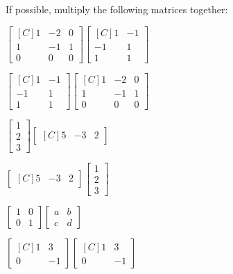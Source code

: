 \begin{exercise} If possible, multiply the following matrices together:\\
\begin{inparaenum}[a)]
\item $\begin{bmatrix*}[C] 1 & -2 & 0 \\ 1 & -1 & 1 \\ 0 & 0 & 0 \end{bmatrix*}\begin{bmatrix*}[C] 1 & -1 \\ -1 & 1 \\ 1 & 1 \end{bmatrix*}$ \hfill
\item $\begin{bmatrix*}[C] 1 & -1 \\ -1 & 1 \\ 1 & 1 \end{bmatrix*}\begin{bmatrix*}[C] 1 & -2 & 0 \\ 1 & -1 & 1 \\ 0 & 0 & 0 \end{bmatrix*}$\hfill {} \\
\item $\begin{bmatrix} 1 \\ 2 \\ 3 \end{bmatrix} \begin{bmatrix*}[C]5 & -3 & 2\end{bmatrix*}$ \hfill 
\item $\begin{bmatrix*}[C]5 & -3 & 2\end{bmatrix*}\begin{bmatrix} 1 \\ 2 \\ 3 \end{bmatrix}$\hfill {} \\
\item $\begin{bmatrix}1 & 0\\0 & 1 \end{bmatrix}\begin{bmatrix}a & b \\ c & d \end{bmatrix}$ \hfill
\item $\begin{bmatrix*}[C]1 & 3\\0 & -1 \end{bmatrix*}\begin{bmatrix*}[C]1 & 3 \\ 0 & -1 \end{bmatrix*}$ \hfill {} \\

\end{inparaenum}
\end{exercise}
